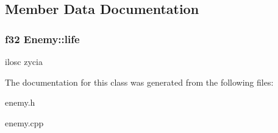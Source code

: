 \subsection{Member Data Documentation}
\hypertarget{class_enemy_ace10e5f8707eadb16af82ea13f49de13}{
\subsubsection[{life}]{\setlength{\rightskip}{0pt plus 5cm}f32 {\bf Enemy::life}}}
\label{class_enemy_ace10e5f8707eadb16af82ea13f49de13}
ilosc zycia 

The documentation for this class was generated from the following files:\begin{DoxyCompactItemize}
\item 
enemy.h\item 
enemy.cpp\end{DoxyCompactItemize}

